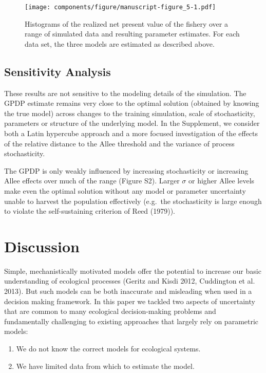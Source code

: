 \documentclass[author-year, 12pt,review]{components/elsarticle} %
\makeatletter
\def\maxwidth{\ifdim\Gin@nat@width>\linewidth\linewidth
\else\Gin@nat@width\fi}
\let\Oldincludegraphics\includegraphics
\renewcommand{\includegraphics}[1]{\Oldincludegraphics[width=\maxwidth]{#1}}
\makeatother
\begin{document}
\begin{figure}[htbp]
\centering
\texttt{[image: components/figure/manuscript-figure\_5-1.pdf]}
\caption{Histograms of the realized net present value of the fishery
over a range of simulated data and resulting parameter estimates. For
each data set, the three models are estimated as described above.}
\end{figure}

\subsection{Sensitivity Analysis}\label{sensitivity-analysis}

These results are not sensitive to the modeling details of the
simulation. The GPDP estimate remains very close to the optimal solution
(obtained by knowing the true model) across changes to the training
simulation, scale of stochasticity, parameters or structure of the
underlying model. In the Supplement, we consider both a Latin hypercube
approach and a more focused investigation of the effects of the relative
distance to the Allee threshold and the variance of process
stochasticity.

The GPDP is only weakly influenced by increasing stochasticity or
increasing Allee effects over much of the range (Figure S2). Larger
\(\sigma\) or higher Allee levels make even the optimal solution without
any model or parameter uncertainty unable to harvest the population
effectively (e.g.~the stochasticity is large enough to violate the
self-sustaining criterion of Reed (1979)).

\section{Discussion}\label{discussion}

Simple, mechanistically motivated models offer the potential to increase
our basic understanding of ecological processes (Geritz and Kisdi 2012,
Cuddington et al. 2013). But such models can be both inaccurate and
misleading when used in a decision making framework. In this paper we
tackled two aspects of uncertainty that are common to many ecological
decision-making problems and fundamentally challenging to existing
approaches that largely rely on parametric models:

\begin{enumerate}
\def\labelenumi{\arabic{enumi}.}
\itemsep1pt\parskip0pt
\item
  We do not know the correct models for ecological systems.
\item
  We have limited data from which to estimate the model.
\end{enumerate}
\end{document}
